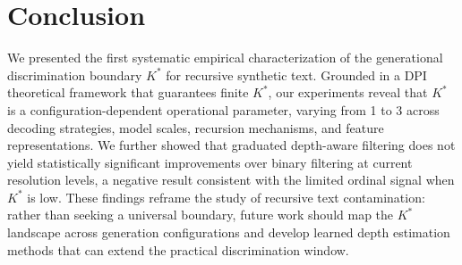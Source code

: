 \documentclass[11pt]{article}
\begin{document}
\section{Conclusion}

We presented the first systematic empirical characterization of the generational discrimination boundary $K^*$ for recursive synthetic text. Grounded in a DPI theoretical framework that guarantees finite $K^*$, our experiments reveal that $K^*$ is a configuration-dependent operational parameter, varying from 1 to 3 across decoding strategies, model scales, recursion mechanisms, and feature representations. We further showed that graduated depth-aware filtering does not yield statistically significant improvements over binary filtering at current resolution levels, a negative result consistent with the limited ordinal signal when $K^*$ is low. These findings reframe the study of recursive text contamination: rather than seeking a universal boundary, future work should map the $K^*$ landscape across generation configurations and develop learned depth estimation methods that can extend the practical discrimination window.


\end{document}
